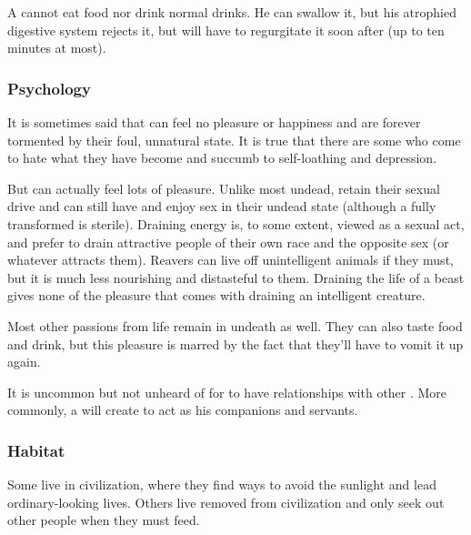 A \Reaver{} cannot eat food nor drink normal drinks. He can swallow it, but his atrophied digestive system rejects it, but will have to regurgitate it soon after (up to ten minutes at most). 

\subsubsection{Psychology}
It is sometimes said that \Reavers{} can feel no pleasure or happiness and are forever tormented by their foul, unnatural state. It is true that there are some \Reavers{} who come to hate what they have become and succumb to self-loathing and depression. 

But \Reavers{} can actually feel lots of pleasure. Unlike most undead, \Reavers{} retain their sexual drive and can still have and enjoy sex in their undead state (although a fully transformed \Reaver{} is sterile). Draining energy is, to some extent, viewed as a sexual act, and \Reavers{} prefer to drain attractive people of their own race and the opposite sex (or whatever attracts them). Reavers can live off unintelligent animals if they must, but it is much less nourishing and distasteful to them. Draining the life of a beast gives none of the pleasure that comes with draining an intelligent creature. 


Most other passions from life remain in undeath as well. They can also taste food and drink, but this pleasure is marred by the fact that they'll have to vomit it up again. 


It is uncommon but not unheard of for \Reavers{} to have relationships with other \Reavers{}. More commonly, a \Reaver{} will create \Leeches{} to act as his companions and servants. 

\subsubsection{Habitat}
Some \Reavers{} live in civilization, where they find ways to avoid the sunlight and lead ordinary-looking lives. Others live removed from civilization and only seek out other people when they must feed. 


